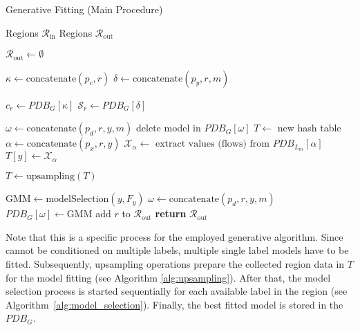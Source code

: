 \documentclass[../../main.tex]{subfiles}
\begin{document}
\begin{algorithm}
    \caption{Generative Fitting (Main Procedure)}
    \label{alg:generative_fitting}
 
    \begin{algorithmic}[1]
        \REQUIRE Regions $\mathcal{R}_{\text{in}}$
        \ENSURE Regions $\mathcal{R}_{\text{out}}$

        \STATE $\mathcal{R}_{\text{out}} \leftarrow \emptyset$


            \STATE $\kappa \leftarrow \text{concatenate}(p_c, r)$
            \STATE $\delta \leftarrow \text{concatenate}(p_y, r, m)$

            \STATE $c_r \leftarrow PDB_G[\kappa]$
            \STATE $\mathcal{S}_r \leftarrow PDB_G[\delta]$ 

                    \STATE $\omega \leftarrow \text{concatenate}(p_d, r, y, m)$ 
                    \STATE delete model in $PDB_G[\omega]$
                \ENDFOR
            \ELSE
                \STATE $T \leftarrow$ new hash table
                    \STATE $\alpha \leftarrow \text{concatenate}(p_x, r, y)$
                    \STATE $\mathcal{X}_\alpha \leftarrow \text{ extract values (flows) from } PDB_{L_m}[\alpha]$
                    \STATE $T[y] \leftarrow \mathcal{X}_\alpha$
                \ENDFOR

                \STATE $T \leftarrow \text{upsampling}(T)$

                    \STATE $\text{GMM} \leftarrow \text{modelSelection}(y, F_y)$
                    \STATE $\omega \leftarrow \text{concatenate}(p_d, r, y, m)$ 
                    \STATE $PDB_G[\omega] \leftarrow \text{GMM}$
                \ENDFOR
                \STATE add $r$ to $\mathcal{R}_{\text{out}}$
            \ENDIF
        \ENDFOR
        \STATE \textbf{return} $\mathcal{R}_{\text{out}}$
    \end{algorithmic}
 \end{algorithm}

 
 Note that this is a specific process for the employed generative algorithm. Since  cannot be conditioned on multiple labels, multiple single label models have to be fitted. Subsequently, upsampling operations prepare the collected region data in $T$ for the model fitting (see Algorithm \ref{alg:upsampling}). After that, the model selection process is started sequentially for each available label in the region (see Algorithm~\ref{alg:model_selection}). Finally, the best fitted model is stored in the $PDB_G$. 
\end{document}
